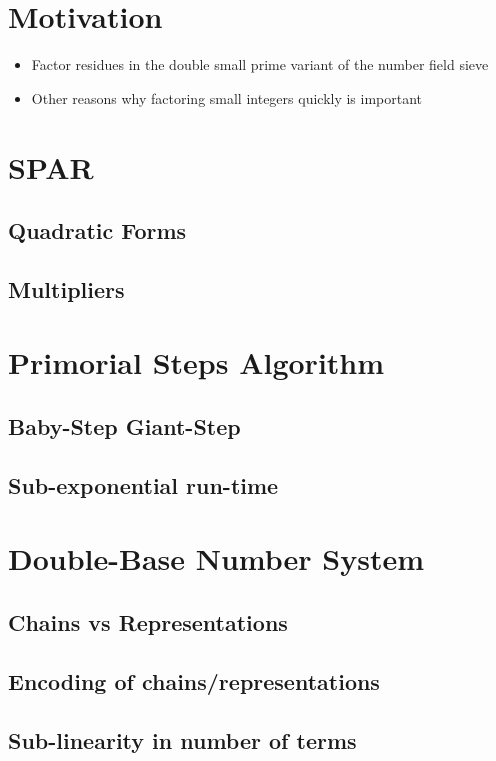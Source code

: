\documentclass[11pt, letterpaper]{article}
\theoremstyle{definition}
\begin{document}
\section{Motivation}
\begin{itemize}
\item Factor residues in the double small prime variant of the number field sieve
\item Other reasons why factoring small integers quickly is important
\end{itemize}

\bigbreak
\section{SPAR}
\subsection{Quadratic Forms}
\subsection{Multipliers}


\bigbreak
\section{Primorial Steps Algorithm}
\subsection{Baby-Step Giant-Step}
\subsection{Sub-exponential run-time}


\bigbreak
\section{Double-Base Number System}
\subsection{Chains vs Representations}
\subsection{Encoding of chains/representations}
\subsection{Sub-linearity in number of terms}
\end{document}
